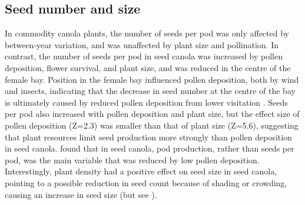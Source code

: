 \documentclass[12pt]{article} %
\begin{document}
\subsection{Seed number and size}
In commodity canola plants, the number of seeds per pod was only affected by between-year variation, and was unaffected by plant size and pollination.
In contrast, the number of seeds per pod in seed canola was increased by pollen deposition, flower survival, and plant size, and was reduced in the centre of the female bay. 
Position in the female bay influenced pollen deposition, both by wind and insects, indicating that the decrease in seed number at the centre of the bay is ultimately caused by reduced pollen deposition from lower visitation \citep{mesquida1981,mesquida1982}.
Seeds per pod also increased with pollen deposition and plant size, but the effect size of pollen deposition (Z=2.3) was smaller than that of plant size (Z=5.6), suggesting that plant resources limit seed production more strongly than pollen deposition in seed canola.
\citet{mesquida1982} found that in seed canola, pod production, rather than seeds per pod, was the main variable that was reduced by low pollen deposition.
Interestingly, plant density had a positive effect on seed size in seed canola, pointing to a possible reduction in seed count because of shading or crowding, causing an increase in seed size (but see \citealp{angadi2003}).
\end{document}
